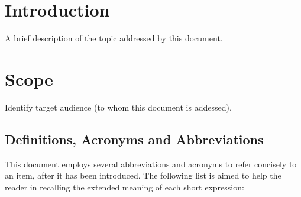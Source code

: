 \section{Introduction}
\label{sec:intro}

A brief description of the topic addressed by this document.


\section{Scope}
\label{sec:scope}

Identify target audience (to whom this document is addessed).


\subsection{Definitions, Acronyms and Abbreviations}
\label{sec:acronyms}

This document employs several abbreviations and acronyms to refer concisely to an item, after it has been introduced. The following list is aimed to help the reader in recalling the extended meaning of each short expression:

